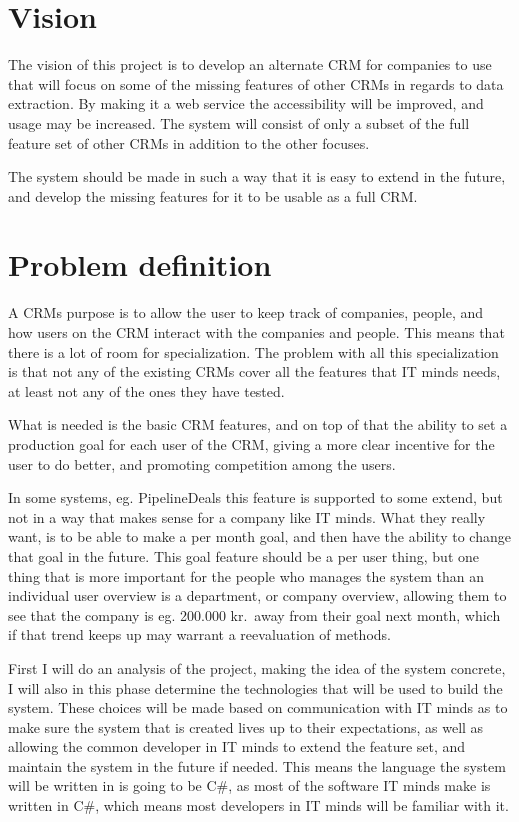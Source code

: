 \section{Vision}
\label{sec:Vision}
The vision of this project is to develop an alternate CRM for companies to use
that will focus on some of the missing features of other CRMs in regards to data
extraction. By making it a web service the accessibility will be improved, and
usage may be increased. The system will consist of only a subset of the full
feature set of other CRMs in addition to the other focuses. 

The system should be made in such a way that it is easy to extend in the future,
and develop the missing features for it to be usable as a full CRM.\

\section{Problem definition}
\label{sec:Problem definition}
A CRMs purpose is to allow the user to keep track of companies, people, and
how users on the CRM interact with the companies and people. This means that
there is a lot of room for specialization. The problem with all this
specialization is that not any of the existing CRMs cover all the features that
IT minds needs, at least not any of the ones they have tested. 

What is needed is the basic CRM features, and on top of that the ability to set
a production goal for each user of the CRM, giving a more clear incentive for
the user to do better, and promoting competition among the users. 

In some systems, eg. PipelineDeals\cite{pipelinedeals:features} this feature is
supported to some extend, but not in a way that makes sense for a company like
IT minds. What they really want, is to be able to make a per month goal, and
then have the ability to change that goal in the future. This goal feature
should be a per user thing, but one thing that is more important for the people
who manages the system than an individual user overview is a department, or
company overview, allowing them to see that the company is eg. 200.000 kr.\ away
from their goal next month, which if that trend keeps up may warrant a
reevaluation of methods. 

First I will do an analysis of the project, making the idea of the system
concrete, I will also in this phase determine the technologies that will be used
to build the system. These choices will be made based on communication with IT
minds as to make sure the system that is created lives up to their
expectations, as well as allowing the common developer in IT minds to extend the
feature set, and maintain the system in the future if needed. This means the
language the system will be written in is going to be C\#, as most of the
software IT minds make is written in C\#, which means most developers in IT
minds will be familiar with it. 

